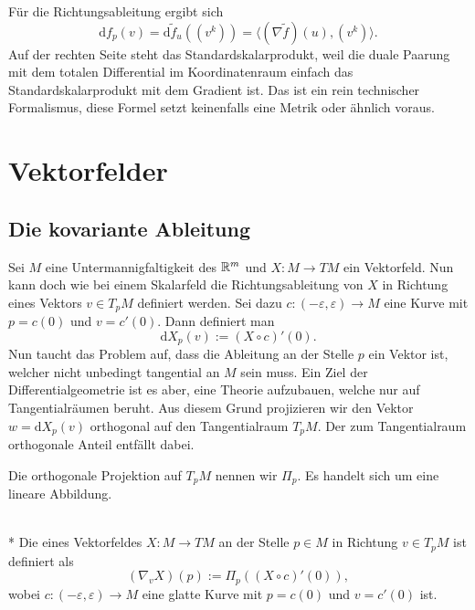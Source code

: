 Für die Richtungsableitung ergibt sich
\begin{equation}
\mathrm df_p(v) = \mathrm d\tilde f_u((v^k)) =
\langle(\nabla \tilde f)(u),(v^k)\rangle.
\end{equation}
Auf der rechten Seite steht das Standardskalarprodukt, weil die
duale Paarung mit dem totalen Differential im Koordinatenraum einfach
das Standardskalarprodukt mit dem Gradient ist. Das ist ein rein
technischer Formalismus, diese Formel setzt keinenfalls eine
Metrik oder ähnlich voraus.


\section{Vektorfelder}

\subsection{Die kovariante Ableitung}

Sei $M$ eine Untermannigfaltigkeit des $\mathbb R^m$ und $X\colon M\to TM$
ein Vektorfeld. Nun kann doch wie bei einem Skalarfeld die
Richtungsableitung von $X$ in Richtung
eines Vektors $v\in T_p M$ definiert werden. Sei dazu
$c\colon (-\varepsilon,\varepsilon)\to M$ eine Kurve
mit $p=c(0)$ und $v=c'(0)$. Dann definiert man%
\begin{equation}
\mathrm dX_p(v) := (X\circ c)'(0).
\end{equation}
Nun taucht das Problem auf, dass die Ableitung an der Stelle $p$
ein Vektor ist, welcher nicht unbedingt tangential an $M$ sein muss.
Ein Ziel der Differentialgeometrie ist es aber, eine Theorie aufzubauen,
welche nur auf Tangentialräumen beruht. Aus diesem Grund projizieren
wir den Vektor $w=\mathrm dX_p(v)$ orthogonal auf den Tangentialraum
$T_p M$. Der zum Tangentialraum orthogonale Anteil entfällt dabei.

Die orthogonale Projektion auf $T_p M$ nennen wir $\Pi_p$. Es handelt
sich um eine lineare Abbildung.

\begin{definition}\mbox{}\\*
Die  eines Vektorfeldes $X\colon M\to TM$
an der Stelle $p\in M$ in Richtung $v\in T_p M$ ist definiert als
\begin{equation}
(\nabla_v X)(p) := \Pi_p((X\circ c)'(0)),
\end{equation}
wobei $c\colon (-\varepsilon,\varepsilon)\to M$ eine glatte Kurve
mit $p=c(0)$ und $v=c'(0)$ ist.
\end{definition}


